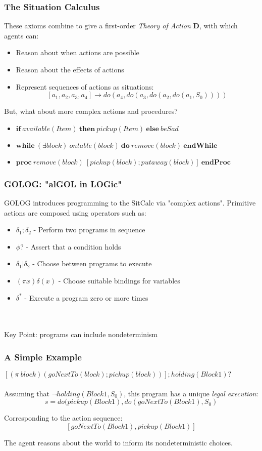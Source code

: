 \documentclass{beamer}
\begin{document}
\begin{frame}
\frametitle{The Situation Calculus}
These axioms combine to give a first-order \emph{Theory of Action} $\mathbf{D}$,
 with which agents can:
\begin{itemize}
  \item Reason about when actions are possible
  \item Reason about the effects of actions
  \item Represent sequences of actions as situations:\[
\left[a_1, a_2, a_3, a_4\right] \rightarrow do(a_4,do(a_3,do(a_2,do(a_1,S_0))))
\]
\end{itemize}
\pause
But, what about more complex actions and procedures?
\begin{itemize}
  \item $\mathbf{if}\ available(Item)\ \mathbf{then}\ pickup(Item)\ \mathbf{else}\ beSad$
  \item $\mathbf{while}\ (\exists block)\ ontable(block)\ \mathbf{do}\ remove(block)\ \mathbf{endWhile}$
  \item $\mathbf{proc}\ remove(block)\ [pickup(block);putaway(block)]\ \mathbf{endProc}$
\end{itemize}
\end{frame}

\begin{frame}
\frametitle{GOLOG: "alGOL in LOGic"}
GOLOG \cite{levesque97golog} introduces programming to the SitCalc via "complex actions".
Primitive actions are composed using operators such as:

\begin{itemize}
  \pause
  \item $\delta_1;\delta_2$ - Perform two programs in sequence
  \pause
  \item $\phi?$ - Assert that a condition holds
  \pause
  \item $\delta_1|\delta_2$ - Choose between programs to execute
  \pause
  \item $(\pi x)\delta(x)$ - Choose suitable bindings for variables
  \pause
  \item $\delta^*$ - Execute a program zero or more times
\end{itemize}
\ \\
\ \\
\pause
Key Point:  programs can include \alert{nondeterminism}
\end{frame}

\begin{frame}
\frametitle{A Simple Example}
$[(\pi\ block)(goNextTo(block);pickup(block))];holding(Block1)?$\\
\ \\
\pause
Assuming that $\neg holding(Block1,S_0)$, this program has a unique
\emph{legal execution}:\[
s = do(pickup(Block1),do(goNextTo(Block1),S_0)\]

Corresponding to the action sequence:\[
[goNextTo(Block1), pickup(Block1)]\]

\pause
The agent reasons about the world to inform its nondeterministic choices.
\end{frame}
\end{document}
